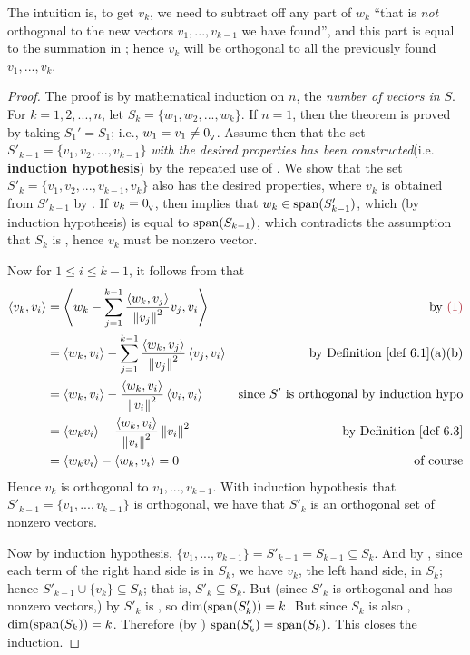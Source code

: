 \begin{note}
The intuition is, to get \(v_k\), we need to subtract off any part of \(w_k\) ``that is \emph{not} orthogonal to the new vectors \(v_1, ..., v_{k - 1}\) we have found'', and this part is equal to the summation in ;
hence \(v_k\) will be orthogonal to all the previously found \(v_1, ..., v_k\).
\end{note}

\begin{proof}
The proof is by mathematical induction on \(n\), the \emph{number of vectors in} \(S\).
For \(k = 1, 2, ..., n\), let \(S_k = \{ w_1, w_2, ..., w_k \}\).
If \(n = 1\), then the theorem is proved by taking \(S_1' = S_1\); i.e., \(w_1 = v_1 \ne 0_{_{\textsf{V}}}\).
Assume then that the set \(S'_{k - 1} = \{ v_1, v_2, ..., v_{k-1} \}\) \emph{with the desired properties has been constructed}(i.e. \textbf{induction hypothesis}) by the repeated use of .
We show that the set \(S'_k = \{ v_1, v_2, ..., v_{k - 1}, v_k \}\) also has the desired properties, where \(v_k\) is obtained from \(S'_{k - 1}\) by .
If \(v_k = 0_{_{\textsf{V}}}\), then  implies that \(w_k \in \operatorname{span}(S'_{k - 1})\), which (by induction hypothesis) is equal to \(\operatorname{span}(S_{k-1})\), which contradicts the assumption that \(S_k\) is \LID{}, hence \(v_k\) must be nonzero vector.

Now for \(1 \le i \le k- 1\), it follows from  that
\begin{align*}
    \LG v_k, v_i \RG & = \LG w_k - \sum_{j = 1}^{k - 1} \frac{\LG w_k, v_j \RG}{\norm{v_j}^2} v_j, v_i \RG & \text{by \MAROON{(1)}} \\
        & = \LG w_k, v_i \RG - \sum_{j = 1}^{k - 1} \frac{\LG w_k, v_j \RG}{\norm{v_j}^2} \LG v_j, v_i \RG & \text{by \DEF{6.1}(a)(b)} \\
        & = \LG w_k, v_i \RG - \frac{\LG w_k, v_i \RG}{\norm{v_i}^2} \LG v_i, v_i \RG & \text{since \(S'\) is orthogonal by induction hypo} \\
        & = \LG w_k v_i \RG - \frac{\LG w_k, v_i \RG}{\norm{v_i}^2} \norm{v_i}^2 & \text{by \DEF{6.3}} \\
        & = \LG w_k v_i \RG - \LG w_k, v_i \RG = 0 & \text{of course}
\end{align*}
Hence \(v_k\) is orthogonal to \(v_1, ..., v_{k - 1}\).
With induction hypothesis that \(S'_{k - 1} = \{ v_1, ..., v_{k - 1} \}\) is orthogonal, we have that \(S'_k\) is an orthogonal set of nonzero vectors.

Now by induction hypothesis, \(\{ v_1, ..., v_{k - 1} \} = S'_{k - 1} = S_{k - 1} \subseteq S_k\).
And by , since each term of the right hand side is in \(S_k\), we have \(v_k\), the left hand side, in \(S_k\);
hence \(S'_{k - 1} \cup \{ v_k \} \subseteq S_k\); that is, \(S'_k \subseteq S_k\).
But (since \(S'_k\) is orthogonal and has nonzero vectors,) by  \(S'_k\) is \LID{}, so \(\dim(\operatorname{span}(S'_k)) = k\).
But since \(S_k\) is also \LID{}, \(\dim(\operatorname{span}(S_k)) = k\).
Therefore (by ) \(\operatorname{span}(S'_k) = \operatorname{span}(S_k)\).
This closes the induction.
\end{proof}


